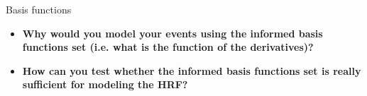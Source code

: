 \documentclass{beamer}
\begin{document}
%
%
%


\begin{frame}{Basis functions}
  \begin{itemize}
    \item \textbf{Why would you model your events using the informed basis functions set (i.e. what is the function of the derivatives)?}


    \bigskip
    \item \textbf{How can you test whether the informed basis functions set is really sufficient for modeling the HRF?}

  \end{itemize}
\end{frame}
\end{document}
